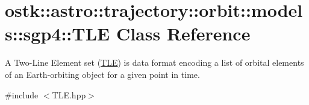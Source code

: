 \hypertarget{classostk_1_1astro_1_1trajectory_1_1orbit_1_1models_1_1sgp4_1_1_t_l_e}{}\section{ostk\+:\+:astro\+:\+:trajectory\+:\+:orbit\+:\+:models\+:\+:sgp4\+:\+:T\+LE Class Reference}
\label{classostk_1_1astro_1_1trajectory_1_1orbit_1_1models_1_1sgp4_1_1_t_l_e}


A Two-\/\+Line Element set (\hyperlink{classostk_1_1astro_1_1trajectory_1_1orbit_1_1models_1_1sgp4_1_1_t_l_e}{T\+LE}) is data format encoding a list of orbital elements of an Earth-\/orbiting object for a given point in time.  




{\ttfamily \#include $<$T\+L\+E.\+hpp$>$}

